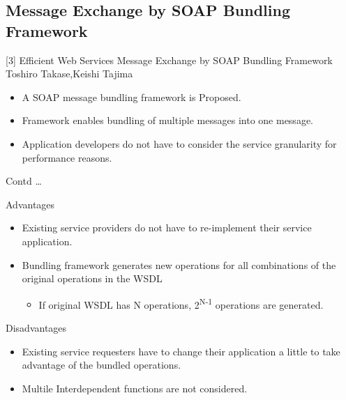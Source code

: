 \documentclass[10pt]{beamer}
\begin{document}
\subsection{Message Exchange by SOAP Bundling Framework}
\begin{frame}{[3] Efficient Web Services Message Exchange by SOAP Bundling Framework}
	{Toshiro Takase,Keishi Tajima}
	\begin{block}{}
\begin{itemize}
\item A SOAP message bundling framework is Proposed.
\item Framework enables bundling of multiple messages into one message.
\item Application developers do not have to consider the service granularity for performance reasons.
\end{itemize}
\end{block}
\end{frame}
\begin{frame}{Contd \dots}
\begin{block}{Advantages}
\begin{itemize}
\item Existing service providers do not have to
re-implement their service application.
\item Bundling framework generates new operations for all combinations of the original operations in the WSDL
\begin{itemize}

\item If original WSDL has N operations, 2\textsuperscript{N-1} operations
are generated.
\end{itemize}
\end{itemize}
\end{block}
\begin{block}{Disadvantages}
\begin{itemize}
\item Existing service requesters have to change their application a little to take advantage of the bundled operations.
\item Multile Interdependent functions are not considered.
\end{itemize}
\end{block}
\end{frame}
\end{document}
